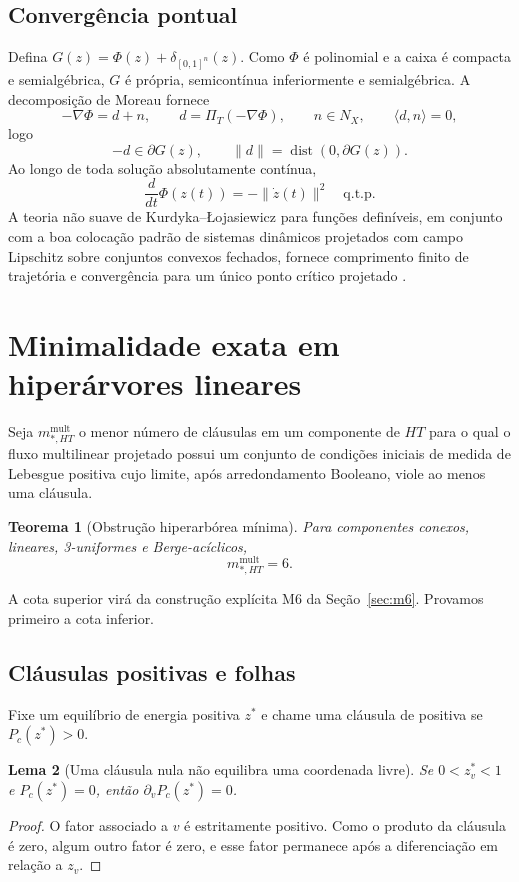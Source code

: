 \documentclass[11pt,a4paper]{article}
\newtheorem{theorem}{Teorema}[section]
\newtheorem{lemma}[theorem]{Lema}
\begin{document}
\subsection{Convergência pontual}
Defina $G(z)=\Phi(z)+\delta_{[0,1]^n}(z)$. Como $\Phi$ é polinomial e a caixa é compacta e semialgébrica, $G$ é própria, semicontínua inferiormente e semialgébrica. A decomposição de Moreau fornece
\[
-\nabla\Phi=d+n,\qquad d=\Pi_T(-\nabla\Phi),\qquad n\in N_X,\qquad \langle d,n\rangle=0,
\]
logo
\[
-d\in\partial G(z),\qquad \|d\|=\operatorname{dist}(0,\partial G(z)).
\]
Ao longo de toda solução absolutamente contínua,
\begin{equation}
\frac{d}{dt}\Phi(z(t))=-\|\dot z(t)\|^2\quad\text{q.t.p.}
\end{equation}
A teoria não suave de Kurdyka--\L{}ojasiewicz para funções definíveis, em conjunto com a boa colocação padrão de sistemas dinâmicos projetados com campo Lipschitz sobre conjuntos convexos fechados, fornece comprimento finito de trajetória e convergência para um único ponto crítico projetado \cite{bolte2007lojasiewicz,bolte2007clarke,brogliato2006equivalence,nagurney1996projected}.

\section{Minimalidade exata em hiperárvores lineares}
Seja $m_{*,HT}^{\mathrm{mult}}$ o menor número de cláusulas em um componente de $HT$ para o qual o fluxo multilinear projetado possui um conjunto de condições iniciais de medida de Lebesgue positiva cujo limite, após arredondamento Booleano, viole ao menos uma cláusula.

\begin{theorem}[Obstrução hiperarbórea mínima]
Para componentes conexos, lineares, 3-uniformes e Berge-acíclicos,
\[
 m_{*,HT}^{\mathrm{mult}}=6.
\]
\end{theorem}
A cota superior virá da construção explícita M6 da Seção~\ref{sec:m6}. Provamos primeiro a cota inferior.

\subsection{Cláusulas positivas e folhas}
Fixe um equilíbrio de energia positiva $z^*$ e chame uma cláusula de positiva se $P_c(z^*)>0$.

\begin{lemma}[Uma cláusula nula não equilibra uma coordenada livre]
Se $0<z_v^*<1$ e $P_c(z^*)=0$, então $\partial_vP_c(z^*)=0$.
\end{lemma}
\begin{proof}
O fator associado a $v$ é estritamente positivo. Como o produto da cláusula é zero, algum outro fator é zero, e esse fator permanece após a diferenciação em relação a $z_v$.
\end{proof}
\end{document}
